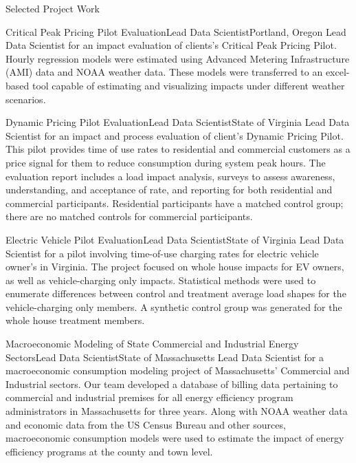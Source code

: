 \documentclass{resume} %
\begin{document}
\begin{rSection}{Selected Project Work}
	\begin{rSubsection}{Critical Peak Pricing Pilot Evaluation}{}{Lead Data Scientist}{Portland, Oregon}
Lead Data Scientist for an impact evaluation of clients's Critical Peak Pricing Pilot. Hourly regression models were estimated using Advanced Metering Infrastructure (AMI) data and NOAA weather data. These models were transferred to an excel-based tool capable of estimating and visualizing impacts under different weather scenarios. 
	\end{rSubsection}
	
	\begin{rSubsection}{Dynamic Pricing Pilot Evaluation}{}{Lead Data Scientist}{State of Virginia}
Lead Data Scientist for an impact and process evaluation of client's Dynamic Pricing Pilot. This pilot provides time of use rates to residential and commercial customers as a price signal for them to reduce consumption during system peak hours. The evaluation report includes a load impact analysis, surveys to assess awareness, understanding, and acceptance of rate, and reporting for both residential and commercial participants. Residential participants have a matched control group; there are no matched controls for commercial participants.
	\end{rSubsection}
	
  \pagebreak
	
	\begin{rSubsection}{Electric Vehicle Pilot Evaluation}{}{Lead Data Scientist}{State of Virginia}
Lead Data Scientist for a pilot involving time-of-use charging rates for electric vehicle owner's in Virginia. The project focused on whole house impacts for EV owners, as well as vehicle-charging only impacts. Statistical methods were used to enumerate differences between control and treatment average load shapes for the vehicle-charging only members. A synthetic control group was generated for the whole house treatment members.
	\end{rSubsection}  

	\begin{rSubsection}{Macroeconomic Modeling of State Commercial and Industrial Energy Sectors}{}{Lead Data Scientist}{State of Massachusetts}
	Lead Data Scientist for a macroeconomic consumption modeling project of Massachusetts' Commercial and Industrial sectors. Our team developed a database of billing data pertaining to commercial and industrial premises for all energy efficiency program administrators in Massachusetts for three years. Along with NOAA weather data and economic data from the US Census Bureau and other sources, macroeconomic consumption models were used to estimate the impact of energy efficiency programs at the county and town level. 
	\end{rSubsection}  


\end{rSection}
\end{document}
